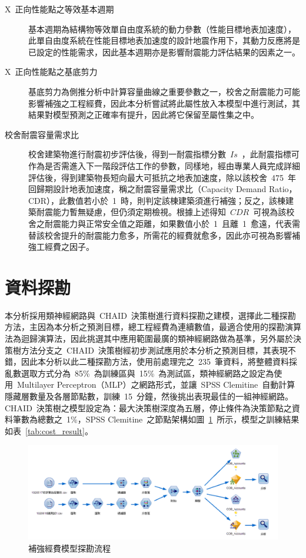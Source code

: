 \begin{description}
  \item[X~正向性能點之等效基本週期]
  \cite{ncree09015}基本週期為結構物等效單自由度系統的動力參數（性能目標地表加速度），此單自由度系統在性能目標地表加速度的設計地震作用下，其動力反應將是已設定的性能需求，因此基本週期亦是影響耐震能力評估結果的因素之一。
  \item[X~正向性能點之基底剪力]
  基底剪力為側推分析中計算容量曲線之重要參數之一，校舍之耐震能力可能影響補強之工程經費，因此本分析嘗試將此屬性放入本模型中進行測試，其結果對模型預測之正確率有提升，因此將它保留至屬性集之中。
  \item[校舍耐震容量需求比]
  \cite{ncree09026}校舍建築物進行耐震初步評估後，得到一耐震指標分數~$Is$~，此耐震指標可作為是否需進入下一階段評估工作的參數，同樣地，經由專業人員完成詳細評估後，得到建築物長短向最大可抵抗之地表加速度，除以該校舍~475~年回歸期設計地表加速度，稱之耐震容量需求比（Capacity Demand Ratio，CDR），此數值若小於~1~時，則判定該棟建築須進行補強；反之，該棟建築耐震能力暫無疑慮，但仍須定期檢視。根據上述得知~$CDR$~可視為該校舍之耐震能力與正常安全值之距離，如果數值小於~1~且離~1~愈遠，代表需替該校舍提升的耐震能力愈多，所需花的經費就愈多，因此亦可視為影響補強工經費之因子。
\end{description}

\section{資料探勘}

本分析採用類神經網路與~CHAID~決策樹進行資料探勘之建模，選擇此二種探勘方法，主因為本分析之預測目標，總工程經費為連續數值，最適合使用的探勘演算法為迴歸演算法，因此挑選其中應用範圍最廣的類神經網路做為基準，另外屬於決策樹方法分支之~CHAID~決策樹經初步測試應用於本分析之預測目標，其表現不錯，因此本分析以此二種探勘方法，使用前處理完之~235~筆資料，將整體資料採亂數選取方式分為~85\%~為訓練區與~15\%~為測試區，類神經網路之設定為使用~Multilayer Perceptron（MLP）之網路形式，並讓~SPSS Clemitine~自動計算隱藏層數量及各層節點數，訓練~15~分鐘，然後挑出表現最佳的一組神經網路。CHAID~決策樹之模型設定為：最大決策樹深度為五層，停止條件為決策節點之資料筆數為總數之~1\%，SPSS Clemitine~之節點架構如圖~\ref{fig:cob-flow}~所示，模型之訓練結果如表~\ref{tab:cost_result}。

\begin{figure}[hbtp]
  \begin{center}
    \includegraphics[width=1.0\textwidth]{figures/cob-flow.png}
    \caption{補強經費模型探勘流程} 
    \label{fig:cob-flow}
  \end{center}
\end{figure}

